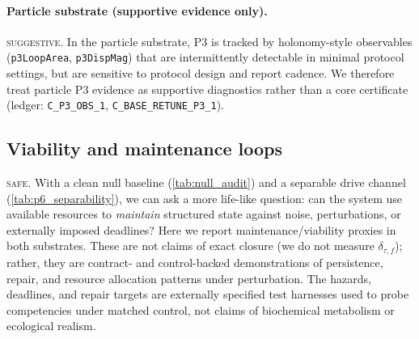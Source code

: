 \documentclass[11pt]{article}
\newcommand{\SAFE}{\textsc{safe}}
\newcommand{\SUGG}{\textsc{suggestive}}
\begin{document}
\paragraph{Particle substrate (supportive evidence only).}
\SUGG. In the particle substrate, P3 is tracked by holonomy-style observables (\texttt{p3LoopArea}, \texttt{p3DispMag}) that are intermittently detectable in minimal protocol settings, but are sensitive to protocol design and report cadence. We therefore treat particle P3 evidence as supportive diagnostics rather than a core certificate (ledger: \texttt{C\_P3\_OBS\_1}, \texttt{C\_BASE\_RETUNE\_P3\_1}).

\subsection{Viability and maintenance loops}\label{sec:results:viability}
\SAFE. With a clean null baseline (\cref{tab:null_audit}) and a separable drive channel (\cref{tab:p6_separability}), we can ask a more life-like question: can the system use available resources to \emph{maintain} structured state against noise, perturbations, or externally imposed deadlines? Here we report maintenance/viability proxies in both substrates. These are not claims of exact closure (we do not measure $\delta_{\tau,f}$); rather, they are contract- and control-backed demonstrations of persistence, repair, and resource allocation patterns under perturbation. The hazards, deadlines, and repair targets are externally specified test harnesses used to probe competencies under matched control, not claims of biochemical metabolism or ecological realism.
\end{document}
